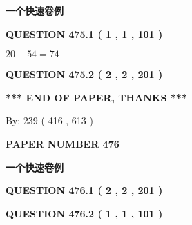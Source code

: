 \documentclass{ctexart}
\begin{document}
   
   
   
 \vspace{0.2in}
{\LARGE {\textbf{ 一个快速卷例}}}
   
   
  
\vspace{0.2in}
  
{\textbf{\Large{QUESTION
475.1 
 ( 1 , 1 , 101 )
}}}
  
  
 
 

$ %
20 +  %
54=   %
74$
 
 
  
\vspace{0.2in}
  
{\textbf{\Large{QUESTION
475.2 
 ( 2 , 2 , 201 )
}}}
  
  
   
   
 \vspace{0.2in}
 
   
   
   
   
\vspace{1.0in} 
{\textbf{\large{ *** END OF PAPER, THANKS *** }}} 
   
   
\hspace{1.0in} By: 
 239 ( 416 ,  613 )
   
   
   
   
\newpage 
\setcounter{page}{ 
   476001 } 
   
   
   
   
 {\textbf{ \Large{ PAPER NUMBER  476  }}}
   
   
\vspace{0.2in}
   
   
   
   
   
   
 \vspace{0.2in}
{\LARGE {\textbf{ 一个快速卷例}}}
   
   
  
\vspace{0.2in}
  
{\textbf{\Large{QUESTION
476.1 
 ( 2 , 2 , 201 )
}}}
  
  
  
\vspace{0.2in}
  
{\textbf{\Large{QUESTION
476.2 
 ( 1 , 1 , 101 )
}}}
  
  
 
\end{document}
